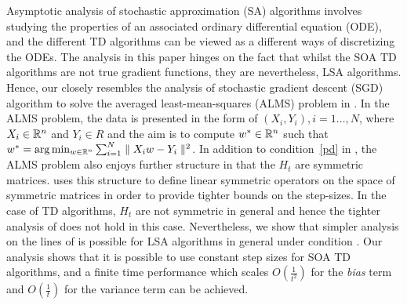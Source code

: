Asymptotic analysis of stochastic approximation (SA) algorithms involves studying the properties of an associated ordinary differential equation (ODE), and the different TD algorithms can be viewed as a different ways of discretizing the ODEs. The analysis in this paper hinges on the fact that whilst the SOA TD algorithms are not true gradient functions, they are nevertheless, LSA algorithms. Hence, our closely resembles the analysis of stochastic gradient descent (SGD) algorithm to solve the averaged least-mean-squares (ALMS) problem in \cite{bachaistats}. In the ALMS problem, the data is presented in the form of $(X_i,Y_i),i=1\ldots,N$, where $X_i\in \mathbb{R}^n$ and $Y_i\in R$ and the aim is to compute $w^*\in \mathbb{R}^n$ such that $w^*=\arg\min_{w\in \mathbb{R}^n}\sum_{i=1}^N\parallel X_iw-Y_i\parallel^2$. In addition to condition~\ref{pd} in , the ALMS problem also enjoys further structure in that the $H_t$ are symmetric matrices. \cite{bachaistats} uses this structure to define linear symmetric operators on the space of symmetric matrices in order to provide tighter bounds on the step-sizes. In the case of TD algorithms, $H_t$ are not symmetric in general and hence the tighter analysis of \cite{bachaistats} does not hold in this case. Nevertheless, we show that simpler analysis on the lines of \cite{bachaistats} is possible for LSA algorithms in general under condition . Our analysis shows that it is possible to use constant step sizes for SOA TD algorithms, and a finite time performance which scales $O(\frac{1}{t^2})$ for the \emph{bias} term and $O(\frac{1}{t})$ for the variance term can be achieved.
